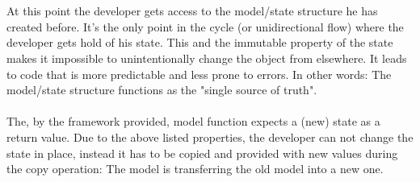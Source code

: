 \\
\\
At this point the developer gets access to the model/state structure he has created before. It's the only point in the cycle (or unidirectional flow) where the 
developer gets hold of his state. This and the immutable property of the state makes it impossible to unintentionally change the object from elsewhere. It leads 
to code that is more predictable and less prone to errors. In other words: The model/state structure functions as the "single source of truth".
\\
\\
The, by the framework provided, model function expects a (new) state as a return value. Due to the above listed properties, the developer can not change the state 
in place, instead it has to be copied and provided with new values during the copy operation: The model is transferring the old model into a new one.

